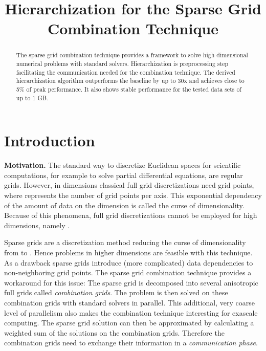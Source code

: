 \documentclass[letterpaper]{article}
\title{Hierarchization for the Sparse Grid Combination Technique
}
\newcommand{\mypar}[1]{{\bf #1.}}
\begin{document}
\maketitle

	\begin{abstract}
		The sparse grid combination technique provides a framework to solve high dimensional numerical problems with standard solvers. 
		Hierarchization is preprocessing step facilitating the communication needed for the combination technique. 
		The derived hierarchization algorithm outperforms the baseline by up to 30x and achieves close to 5\% of peak performance. It also shows stable performance for the tested data sets of up to 1 GB.


\end{abstract}
	
	\section{Introduction}\label{sec:intro}

		\mypar{Motivation}
			 The standard way to discretize Euclidean spaces for scientific computations, for example to solve partial differential equations, are regular grids. However, in  dimensions classical full grid discretizations need  grid points, where  represents the number of grid points per axis. This exponential dependency of the amount of data on the dimension is called the curse of dimensionality. Because of this phenomena, full grid discretizations cannot be employed for high dimensions, namely \mbox{}. 


			Sparse grids \cite{smolyak63quadrature, zenger91sparse, bungartz04sparseGrids} are a discretization method reducing the curse of dimensionality from   to  . Hence problems in higher dimensions are feasible with this technique.  As a drawback sparse grids introduce (more complicated) data dependencies to non-neighboring grid points.
			The sparse grid combination technique \cite{griebel92CombiTechnique} provides a workaround for this issue: The sparse grid is decomposed into several anisotropic full grids called \emph{combination grids}. The problem is then solved on these combination grids with standard solvers in parallel. This additional, very coarse level of parallelism also makes the combination technique interesting for exascale computing.
			The sparse grid solution can then be approximated by calculating a weighted sum of the solutions on the combination grids. Therefore the combination grids need to exchange their information in a \emph{communication phase}.
			
\end{document}
